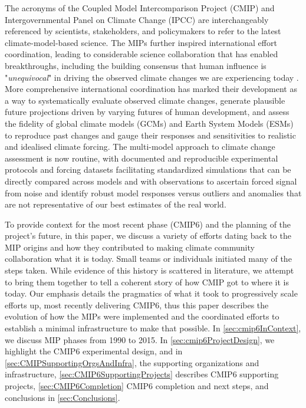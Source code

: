 \documentclass[gmd, preprint]{copernicus}
\begin{document}
The acronyms of the Coupled Model Intercomparison Project (CMIP) and Intergovernmental Panel on Climate Change (IPCC) are interchangeably referenced by scientists, stakeholders, and policymakers to refer to the latest climate-model-based science. The MIPs further inspired international effort coordination, leading to considerable science collaboration that has enabled breakthroughs, including the building consensus that human influence is "\textit{unequivocal}" in driving the observed climate changes we are experiencing today \citep{eyring_human_2021}. More comprehensive international coordination has marked their development as a way to systematically evaluate observed climate changes, generate plausible future projections driven by varying futures of human development, and assess the fidelity of global climate models (GCMs) and Earth System Models (ESMs) to reproduce past changes and gauge their responses and sensitivities to realistic and idealised climate forcing. The multi-model approach to climate change assessment is now routine, with documented and reproducible experimental protocols and forcing datasets facilitating standardized simulations that can be directly compared across models and with observations to ascertain forced signal from noise and identify robust model responses versus outliers and anomalies that are not representative of our best estimates of the real world.

To provide context for the most recent phase (CMIP6) and the planning of the project’s future, in this paper, we discuss a variety of efforts dating back to the MIP origins and how they contributed to making climate community collaboration what it is today. Small teams or individuals initiated many of the steps taken. While evidence of this history is scattered in literature, we attempt to bring them together to tell a coherent story of how CMIP got to where it is today. Our emphasis details the pragmatics of what it took to progressively scale efforts up, most recently delivering CMIP6, thus this paper describes the evolution of how the MIPs were implemented and the coordinated efforts to establish a minimal infrastructure to make that possible. In \autoref{sec:cmip6InContext}, we discuss MIP phases from 1990 to 2015. In \autoref{sec:cmip6ProjectDesign}, we highlight the CMIP6 experimental design, and in \autoref{sec:CMIPSupportingOrgsAndInfra}, the supporting organizations and infrastructure, \autoref{sec:CMIP6SupportingProjects} describes CMIP6 supporting projects, \autoref{sec:CMIP6Completion} CMIP6 completion and next steps, and conclusions in \autoref{sec:Conclusions}.
\end{document}
